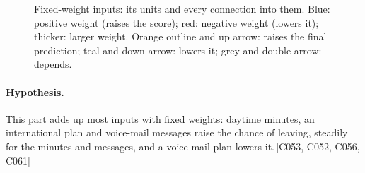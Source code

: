 \documentclass[a4paper,10pt]{article}
\newif\ifreviewmarks
\newcommand{\reviewrule}{\noindent{\color{BrickRed}\rule{\linewidth}{0.8pt}}}
\newenvironment{drafted}[1][]{%
  \ifreviewmarks\par\addvspace{\medskipamount}\reviewrule\par\nopagebreak
  \noindent{\color{BrickRed}\sffamily\footnotesize\textbf{Thesis Draft}\quad #1\hfill review}\par\nopagebreak\smallskip\fi}{%
  \ifreviewmarks\par\smallskip\noindent{\color{BrickRed}\sffamily\footnotesize end of thesis draft}\par\nopagebreak\reviewrule\par\medskip\fi}
\begin{document}
\begin{drafted}[plain-language layer: churn100-s2-c2]
\begin{figure}[H]
{}%
\caption{Fixed-weight inputs: its units and every connection into them. Blue: positive weight (raises the score); red: negative weight (lowers it); thicker: larger weight. Orange outline and up arrow: raises the final prediction; teal and down arrow: lowers it; grey and double arrow: depends.}
\label{fig:churn100s2c2:units-ann89}
\end{figure}
\paragraph{Hypothesis.} This part adds up most inputs with fixed weights: daytime minutes, an international plan and voice-mail messages raise the chance of leaving, steadily for the minutes and messages, and a voice-mail plan lowers it.\,{\scriptsize\textcolor{NavyBlue}{[C053, C052, C056, C061]}}

\end{drafted}
\end{document}
